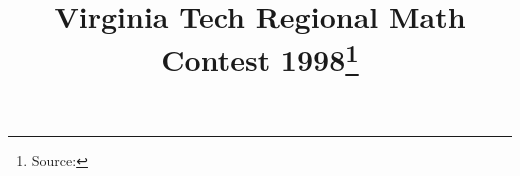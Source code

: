 \documentclass[10pt]{article}
\begin{document}
\title{Virginia Tech Regional Math Contest 1998\footnote{Source: \source}}
\author{\vspace{-2ex}}
\date{\vspace{-6ex}} %
\maketitle






\end{document}
